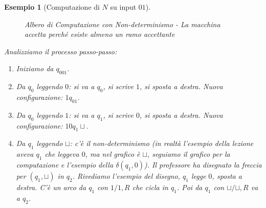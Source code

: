 \documentclass[a4paper]{article}
\newtheorem{example}{Esempio}
\begin{document}
\begin{example}[Computazione di $N$ su input $01$]
\begin{figure}[h!]
    \caption{Albero di Computazione con Non-determinismo - La macchina accetta perché esiste almeno un ramo accettante}
\end{figure}
Analizziamo il processo passo-passo:
\begin{enumerate}
    \item Iniziamo da $q_001$.
    \item Da $q_0$ leggendo $0$: si va a $q_0$, si scrive $1$, si sposta a destra. Nuova configurazione: $1q_01$.
    \item Da $q_0$ leggendo $1$: si va a $q_1$, si scrive $0$, si sposta a destra. Nuova configurazione: $10q_1\sqcup$.
    \item Da $q_1$ leggendo $\sqcup$: c'è il non-determinismo (in realtà l'esempio della lezione aveva $q_1$ che leggeva $0$, ma nel grafico è $\sqcup$, seguiamo il grafico per la computazione e l'esempio della $\delta(q_1,0)$). Il professore ha disegnato la freccia per $(q_1, \sqcup)$ in $q_2$. Rivediamo l'esempio del disegno, $q_1$ legge $0$, sposta a destra. C'è un arco da $q_1$ con $1/1,R$ che cicla in $q_1$. Poi da $q_1$ con $\sqcup/\sqcup,R$ va a $q_2$.
    

\end{enumerate}
\end{example}
\end{document}
